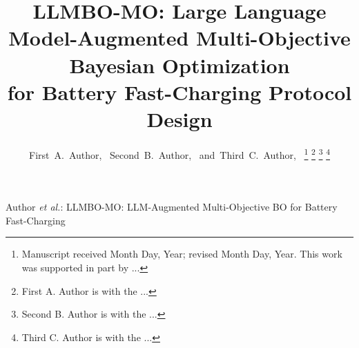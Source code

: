 \documentclass[journal]{IEEEtran}
\begin{document}
\title{
LLMBO-MO: Large Language Model-Augmented Multi-Objective Bayesian Optimization \\
for Battery Fast-Charging Protocol Design
}

\author{
First~A.~Author,~
Second~B.~Author,~
and~Third~C.~Author,~%
\thanks{Manuscript received Month Day, Year; revised Month Day, Year.
This work was supported in part by ...}
\thanks{First A. Author is with the ...}
\thanks{Second B. Author is with the ...}
\thanks{Third C. Author is with the ...}
}

%
{Author \MakeLowercase{\textit{et al.}}: LLMBO-MO: LLM-Augmented Multi-Objective BO for Battery Fast-Charging}

\maketitle



\IEEEpeerreviewmaketitle



\end{document}
